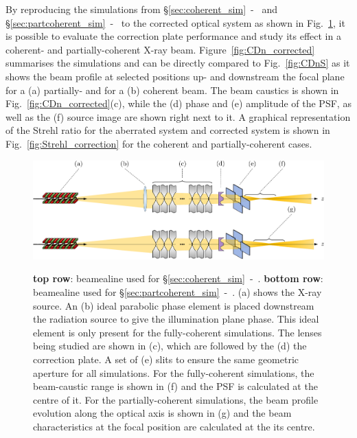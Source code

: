 \begin{refsection}
By reproducing the simulations from \S\ref{sec:coherent_sim}~-~\textit{} and \S\ref{sec:partcoherent_sim}~-~\textit{} to the corrected optical system as shown in Fig.~\ref{fig:optical_setups_corrected}, it is possible to evaluate the correction plate performance and study its effect in a coherent- and partially-coherent X-ray beam. Figure~\ref{fig:CDn_corrected} summarises the simulations and can be directly compared to Fig.~\ref{fig:CDnS} as it
shows the beam profile at selected positions up- and downstream the focal plane for a (a) partially- and for a (b) coherent beam. The beam caustics is shown in Fig.~\ref{fig:CDn_corrected}(c), while the (d) phase and (e) amplitude of the PSF, as well as the (f) source image are shown right next to it. A graphical representation of the Strehl ratio for the aberrated system and corrected system is shown in Fig.~\ref{fig:Strehl_correction} for the coherent and partially-coherent cases.

\begin{figure}[t]
        \centering
        {\includegraphics[width=0.8\linewidth]{figures/ch06/optical_setups_corrected.pdf}}
        \caption[Beamlines for coherent- and partially-coherent simulations]{\textbf{top row}: beamealine used for  \S\ref{sec:coherent_sim}~-~\textit{}. \textbf{bottom row}: beamealine used for  \S\ref{sec:partcoherent_sim}~-~\textit{}. (a) shows the X-ray source. An (b) ideal parabolic phase element is placed downstream the radiation source to give the illumination plane phase. This ideal element is only present for the fully-coherent simulations. The lenses being studied are shown in (c), which are followed by the (d) the correction plate. A set of (e) slits to ensure the same geometric aperture for all simulations. For the fully-coherent simulations, the beam-caustic range is shown in (f) and the PSF is calculated at the centre of it. For the partially-coherent simulations, the beam profile evolution along the optical axis is shown in (g) and the beam characteristics at the focal position are calculated at the its centre. 
        }\label{fig:optical_setups_corrected}
\end{figure}



\end{refsection}
